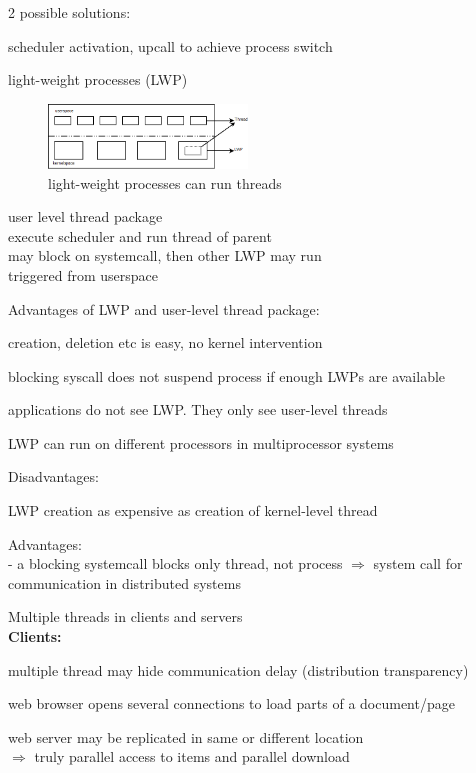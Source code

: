 2 possible solutions:\\
\begin{compactenum}
\item scheduler activation, upcall to achieve process switch
\item light-weight processes (LWP)\\
\begin{figure}[h]
	\centering
	\includegraphics[width=200px]{gfx/thread_lwp.png}
	\caption{light-weight processes can run threads}
	\label{img:lwp_threads}
\end{figure}
user level thread package\\
execute scheduler and run thread of parent\\
may block on systemcall, then other LWP may run\\
triggered from userspace\\
\end{compactenum}
Advantages of LWP and user-level thread package:\\
\begin{compactenum}
\item creation, deletion etc is easy, no kernel intervention
\item blocking syscall does not suspend process if enough LWPs are available
\item applications do not see LWP. They only see user-level threads
\item LWP can run on different processors in multiprocessor systems
\end{compactenum}

Disadvantages:\\
\begin{compactenum}
\item LWP creation as expensive as creation of kernel-level thread
\end{compactenum}

Advantages:\\
- a blocking systemcall blocks only thread, not process
$\Rightarrow$ system call for communication in distributed systems

Multiple threads in clients and servers\\

\textbf{Clients:}\\
\begin{compactitem}
\item multiple thread may hide communication delay (distribution transparency)
\item web browser opens several connections to load parts of a document/page
\item web server may be replicated in same or different location\\
$\Rightarrow$ truly parallel access to items and parallel download
\end{compactitem}

